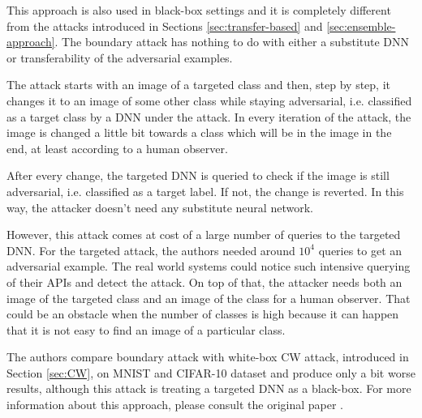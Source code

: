 This approach is also used in black-box settings and it is completely different from the attacks introduced in Sections \ref{sec:transfer-based} and \ref{sec:ensemble-approach}. The boundary attack has nothing to do with either a substitute DNN or transferability of the adversarial examples. 

The attack starts with an image of a targeted class and then, step by step, it changes it to an image of some other class while staying adversarial, i.e. classified as a target class by a DNN under the attack. In every iteration of the attack, the image is changed a little bit towards a class which will be in the image in the end, at least according to a human observer. 

After every change, the targeted DNN is queried to check if the image is still adversarial, i.e. classified as a target label. If not, the change is reverted. In this way, the attacker doesn't need any substitute neural network. 

However, this attack comes at cost of a large number of queries to the targeted DNN. For the targeted attack, the authors needed around $10^4$ queries to get an adversarial example. The real world systems could notice such intensive querying of their APIs and detect the attack. On top of that, the attacker needs both an image of the targeted class and an image of the class for a human observer. That could be an obstacle when the number of classes is high because it can happen that it is not easy to find an image of a particular class.

The authors \cite{brendel2018decisionbased} compare boundary attack with white-box CW attack, introduced in Section \ref{sec:CW}, on MNIST and CIFAR-10 dataset and produce only a bit worse results, although this attack is treating a targeted DNN as a black-box.  For more information about this approach, please consult the original paper \cite{brendel2018decisionbased}.
